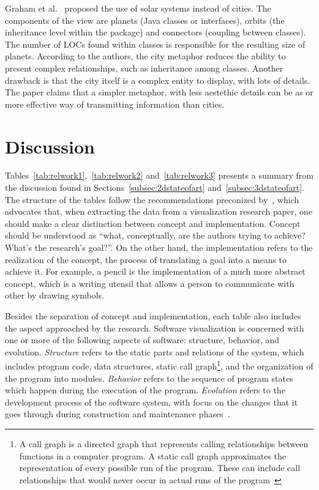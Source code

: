 Graham et al.~\cite{graham2004solar} proposed the use of solar systems instead
of cities.
The components of the view are planets (Java classes or interfaces), orbits (the
inheritance level within the package) and connectors (coupling between classes).
The number of LOCs found within classes is responsible for the resulting size of
planets. According to the authors, the city metaphor reduces the ability to
present complex relationships, such as inheritance among classes. Another
drawback is that the city itself is a complex entity to display, with lots of
details. The paper claims that a simpler metaphor, with less aestethic details
can be as or more effective way of transmitting information than cities.

\section{Discussion}

Tables~\ref{tab:relwork1},~\ref{tab:relwork2} and~\ref{tab:relwork3} presents a
summary from the discussion found in Sections~\ref{subsec:2dstateofart}
and~\ref{subsec:3dstateofart}. The structure of the tables follow the
recommendations preconized by~\cite{laramee2011read}, which advocates
that, when extracting the data from a visualization research paper, one should
make a clear distinction between concept and implementation. Concept should be
understood as ``what, conceptually, are the authors trying to achieve? What's
the research's goal?''\cite[p. 79]{laramee2011read}. On the other hand, the
implementation refers to the realization of the concept, the process of
translating a goal into a means to achieve it.
For example, a pencil is the implementation of a much more abstract concept,
which is a writing utensil that allows a person to communicate with other by
drawing symbols.

Besides the separation of concept and implementation, each table also includes
the aspect approached by the research.
Software visualization is concerned with one or more of the following aspects of
software: structure, behavior, and evolution. \textit{Structure} refers to the
static parts and relations of the system, which includes program code, data
structures, static call graph\footnote{A call graph is a directed graph that
represents calling relationships between functions in a computer program. A
static call graph approximates the representation of every possible run of the
program. These can include call relationships that would never occur in actual
runs of the program~\cite{grove1997call,ryder1979constructing}}, and the
organization of the program into modules.
\textit{Behavior} refers to the sequence of program states which happen during
the execution of the program.
\textit{Evolution} refers to the development process of the software system,
with focus on the changes that it goes through during construction and
maintenance phases~\cite{diehl2007software}.

